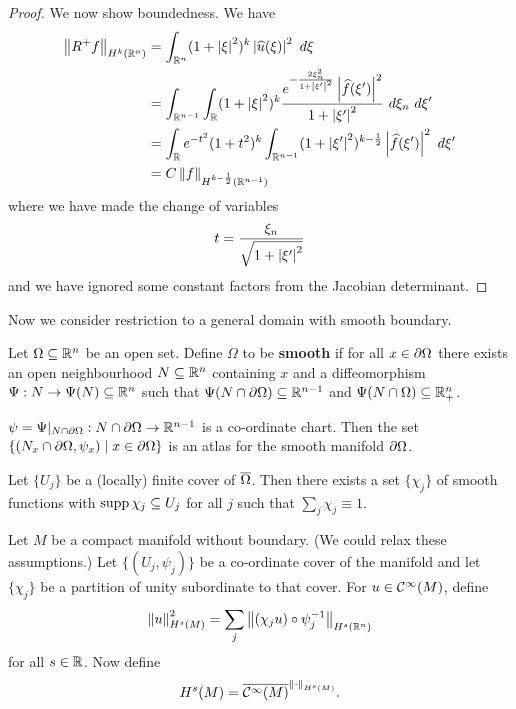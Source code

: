 \begin{proof}
  We now show boundedness.
  We have
  \begin{align*}
    \left\lVert R^+f \right\rVert_{H^k(\mathbb{R}^n)} &= \int_{\mathbb{R}^n} (1+\left\lvert \xi \right\rvert^2)^k \left\lvert \widehat u(\xi) \right\rvert^2 \ d\xi \\
    &= \int_{\mathbb{R}^{n-1}} \int_{\mathbb{R}} (1+\left\lvert \xi \right\rvert^2)^k \frac{e^{-\frac{2\xi_n^2}{1+\left\lvert \xi' \right\rvert^2}}\left\lvert \widehat f(\xi') \right\rvert^2}{1+\left\lvert \xi' \right\rvert^2} \ d\xi_n \ d\xi' \\
    &= \int_{\mathbb{R}} e^{-t^2}(1+t^2)^k \int_{\mathbb{R}^{n-1}} (1+\left\lvert \xi' \right\rvert^2)^{k-\frac12} \left\lvert \widehat f(\xi') \right\rvert^2 \ d\xi' \\
      &= C\left\lVert f \right\rVert_{H^{k-\frac12}(\mathbb{R}^{n-1})}
  \end{align*}
  where we have made the change of variables
  \[ t=\frac{\xi_n}{\sqrt{1+\left\lvert \xi' \right\rvert^2}} \]
  and we have ignored some constant factors from the Jacobian determinant.
\end{proof}

Now we consider restriction to a general domain with smooth boundary.

\begin{defn}
  Let $\Omega \subseteq \mathbb{R}^n$ be an open set.
  Define $\Omega$ to be \textbf{smooth} if for all $x\in\partial\Omega$ there exists an open neighbourhood $N \subseteq \mathbb{R}^n$ containing $x$ and a diffeomorphism $\Psi: N \to \Psi(N) \subseteq \mathbb{R}^n$ such that $\Psi(N\cap\partial\Omega)\subseteq\mathbb{R}^{n-1}$ and $\Psi(N\cap\Omega)\subseteq\mathbb{R}_+^n$.
\end{defn}

\begin{rmk}
  $\psi = \Psi|_{N\cap\partial\Omega}: N\cap\partial\Omega \to \mathbb{R}^{n-1}$ is a co-ordinate chart.
  Then the set $\{ (N_x\cap\partial\Omega,\psi_x) \mid x \in \partial\Omega \}$ is an atlas for the smooth manifold $\partial\Omega$.
\end{rmk}

\begin{lem}
  Let $\{U_j\}$ be a (locally) finite cover of $\overline\Omega$.
  Then there exists a set $\{\chi_j\}$ of smooth functions with $\operatorname{supp}\chi_j\subseteq U_j$ for all $j$ such that $\sum_j \chi_j \equiv 1$.
\end{lem}

\begin{defn}
  Let $M$ be a compact manifold without boundary.
  (We could relax these assumptions.)
  Let $\{(U_j,\psi_j)\}$ be a co-ordinate cover of the manifold and let $\{\chi_j\}$ be a partition of unity subordinate to that cover.
  For $u\in\mathcal{C}^\infty(M)$, define
  \[ \left\lVert u \right\rVert_{H^s(M)}^2 = \sum_j \left\lVert (\chi_ju)\circ\psi_j^{-1} \right\rVert_{H^s(\mathbb{R}^n)} \]
  for all $s\in\mathbb{R}$.
  Now define
  \[ H^s(M) = \overline{\mathcal{C}^\infty(M)}^{\left\lVert \cdot \right\rVert_{H^s(M)}}. \]
\end{defn}

